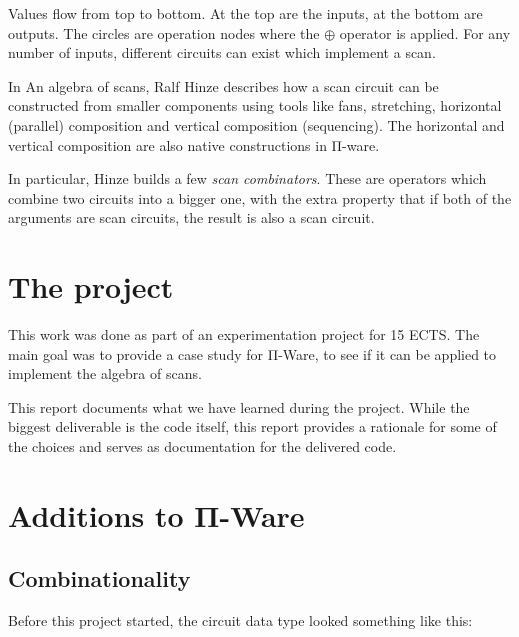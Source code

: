 
Values flow from top to bottom.
At the top are the inputs, at the bottom are outputs.
The circles are operation nodes where the $\oplus$ operator is
applied.
For any number of inputs, different circuits can exist which implement
a scan.

In An algebra of scans\cite{hinze04}, Ralf Hinze describes how a
scan circuit can be constructed from smaller components using tools
like fans, stretching, horizontal (parallel) composition and vertical
composition (sequencing).
The horizontal and vertical composition are also native constructions
in Π-ware.

In particular, Hinze builds a few \emph{scan combinators}.
These are operators which combine two circuits into a bigger one, with
the extra property that if both of the arguments are scan circuits,
the result is also a scan circuit.

\section{The project}\label{The-project}

This work was done as part of an experimentation project for 15 ECTS.
The main goal was to provide a case study for Π-Ware, to see if it can
be applied to implement the algebra of scans.

This report documents what we have learned during the project.
While the biggest deliverable is the code itself, this report provides
a rationale for some of the choices and serves as documentation for
the delivered code.

\section{Additions to Π-Ware}\label{additions-to-piware}

\subsection{Combinationality}\label{combinationality}

Before this project started, the circuit data type  looked
something like this:


